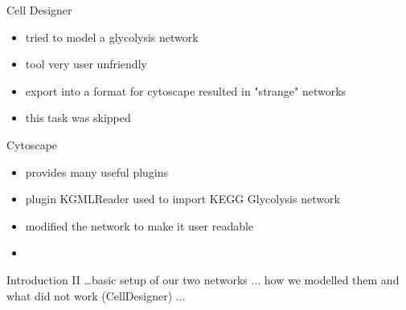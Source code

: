 \begin{frame}{Cell Designer}
	\begin{itemize}
		\item tried to model a glycolysis network
		\item tool very user unfriendly
		\item export into a format for cytoscape resulted in "strange" networks
		\item this task was skipped
	\end{itemize}
\end{frame}

\begin{frame}{Cytoscape}
	\begin{itemize}
		\item provides many useful plugins 
		\item plugin KGMLReader used to import KEGG Glycolysis network
		\item modified the network to make it user readable
		\item 
	\end{itemize}
\end{frame}


\begin{frame}{Introduction II}
\dots basic setup of our two networks ... how we modelled them and what did not work (CellDesigner) ...
\end{frame}


